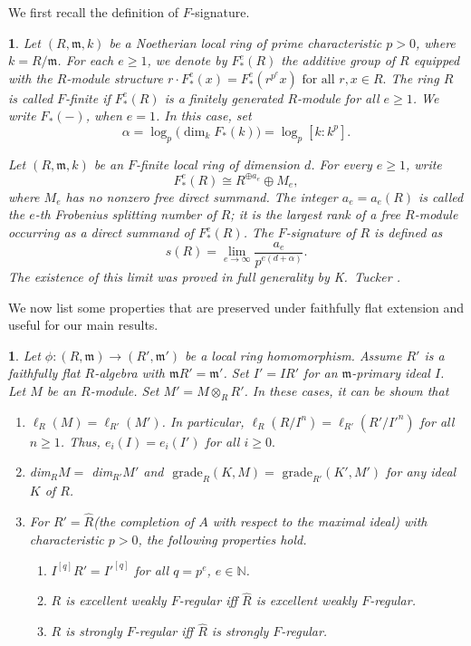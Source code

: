 \documentclass[11pt, reqno]{amsart}
\theoremstyle{plain}
\newtheorem{point}[theorem]{}
\newcommand{\m}{\mathfrak{m}}
\newcommand{\N}{\mathbb{N}}
\theoremstyle{plain}
\begin{document}
We first recall the definition of $F$-signature.
\begin{point} 
\normalfont
Let $(R,\mathfrak{m},k)$ be a Noetherian local ring of prime
characteristic $p>0$, where $k=R/\mathfrak{m}$. For each $e\geq 1$, we denote by $F_*^e(R)$ the additive group of $R$ equipped with the $R$-module structure $r\cdot F_*^e (x)=F_*^e(r^{p^e}x)
\text{ for all }r,x\in R.$
The ring $R$ is called \emph{$F$-finite} if $F_*^e(R)$ is a finitely generated $R$-module for all $e\geq 1$. We write $F_*(-)$, when $e=1$. In this case, set
\[
\alpha=\log_p\bigl(\dim_k F_*(k)\bigr)
      =\log_p[k:k^p].
\]


Let $(R,\mathfrak{m},k)$ be an $F$-finite local ring of dimension $d$.
For every $e\geq 1$, write
\[
F_*^e(R)\cong R^{\oplus a_e}\oplus M_e,
\]
where $M_e$ has no nonzero free direct summand. The integer
$a_e=a_e(R)$ is called the \emph{$e$-th Frobenius splitting number}
of $R$; it is the largest rank of a free $R$-module occurring as a
direct summand of $F_*^e(R)$. The \emph{$F$-signature} of $R$ is defined as
$$s(R)=\lim_{e\to\infty}
\frac{a_e}{p^{e(d+\alpha)}}.$$
The existence of this limit was proved in full generality by
K.~Tucker \cite{Tucker12}. %
\end{point}
We now list some properties that are preserved under faithfully flat extension and useful for our main results.
\begin{point}\label{flat}
    \normalfont
 Let $\phi:(R,\mathfrak{m})\to (R',\mathfrak{m}')$ be a local ring homomorphism. Assume $R'$ is a faithfully flat $R$-algebra with $\mathfrak{m}R'=\mathfrak{m}'$. Set $I'=IR'$ for an $\m$-primary ideal $I$. Let $M$ be an $R$-module. Set $M'=M\otimes_R R'$. In these cases, it can be shown that
\begin{enumerate}
    \item $\ell_R(M)=\ell_{R'}(M')$. In particular, $\ell_R(R/I^n)=\ell_{R'}(R'/I'^n)$ for all $n\geq 1$. Thus, $e_i(I)=e_i(I')$ for all $i\geq 0.$
    \item dim$_{R}M=$ dim$_{R'}M'$ and $\text{ grade}_R (K,M)= \text{ grade}_{R'} (K',M')$ for any ideal $K$ of $R$.
  \item For $R'=\widehat{R}$(the completion of $A$ with respect to the maximal ideal) with characteristic $p>0$, the following properties hold.
  \begin{enumerate}
      \item[{(a)}] $I^{[q]}R'=I'^{[q]}$ for all $q=p^e$, $e\in \N$.
      \item[{(b)}] \cite[Corollary~7.28]{HH94} $R$ is excellent weakly $F$-regular iff $\widehat{R}$ is excellent weakly $F$-regular.
      \item[{(c)}] \cite[Theorem 2.23]{Yao} $R$ is strongly $F$-regular iff $\widehat{R}$ is strongly $F$-regular.
  \end{enumerate}
\end{enumerate}

\end{point}
\end{document}
